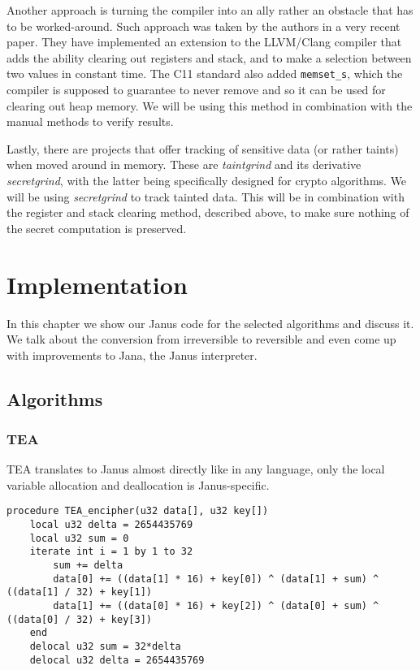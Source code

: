 \documentclass[a4paper,10pt,openright]{memoir}
\newcommand{\term}[1]{\textit{#1}}
\newcommand{\code}[1]{\texttt{#1}}
\begin{document}
Another approach is turning the compiler into an ally rather an 
obstacle that has to be worked-around. Such approach was taken by the 
authors in a very recent paper\cite{whatyouc}. They have implemented an 
extension to the LLVM/Clang compiler that adds the ability clearing out 
registers and stack, and to make a selection between two values in 
constant time. The C11 standard also added \code{memset\_s}, which the 
compiler is supposed to guarantee to never remove and so it can be used 
for clearing out heap memory. We will be using this method in 
combination with the manual methods to verify results.

Lastly, there are projects that offer tracking of sensitive data (or 
rather taints) when moved 
around in memory. These are \term{taintgrind} and its derivative 
\term{secretgrind}, with the latter being specifically designed for 
crypto algorithms. We will be using \term{secretgrind} to track tainted data. 
This will be in combination with the register and stack clearing 
method, described above, to make sure nothing of the secret computation 
is preserved.



\chapter{Implementation}

In this chapter we show our Janus code for the selected algorithms and 
discuss it. We talk about the conversion from irreversible to 
reversible and even come up with improvements to Jana, the Janus 
interpreter.


\section{Algorithms}

\subsection{TEA}
\label{sec:impl:tea}

TEA translates to Janus almost directly like in any language, only the 
local variable allocation and deallocation is Janus-specific.

\begin{lstlisting}[language=Janus]
procedure TEA_encipher(u32 data[], u32 key[])
    local u32 delta = 2654435769
    local u32 sum = 0
    iterate int i = 1 by 1 to 32
        sum += delta
        data[0] += ((data[1] * 16) + key[0]) ^ (data[1] + sum) ^ ((data[1] / 32) + key[1])
        data[1] += ((data[0] * 16) + key[2]) ^ (data[0] + sum) ^ ((data[0] / 32) + key[3])
    end
    delocal u32 sum = 32*delta
    delocal u32 delta = 2654435769
\end{lstlisting}
\end{document}
